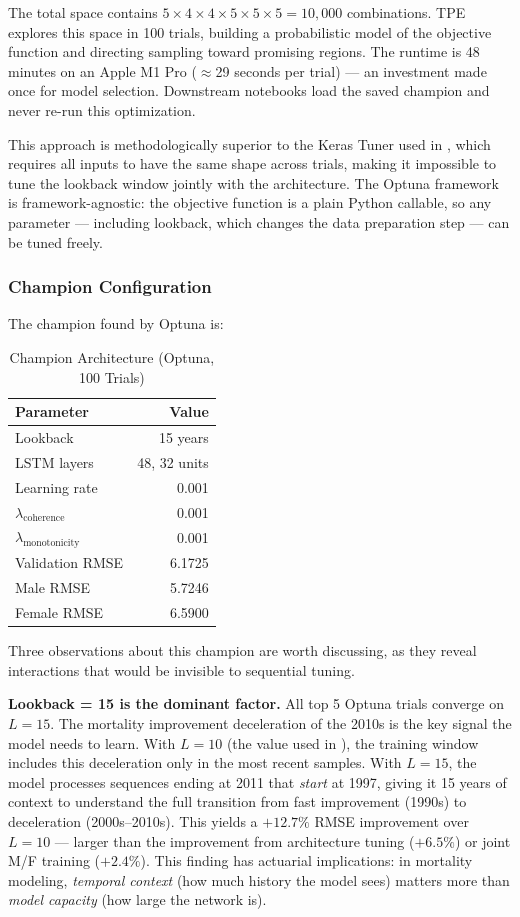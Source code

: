 \documentclass[11pt,a4paper]{article}
\begin{document}
The total space contains $5 \times 4 \times 4 \times 5 \times 5 \times 5 = 10{,}000$ combinations. TPE explores this space in 100 trials, building a probabilistic model of the objective function and directing sampling toward promising regions. The runtime is 48 minutes on an Apple M1 Pro ($\approx$29 seconds per trial) --- an investment made once for model selection. Downstream notebooks load the saved champion and never re-run this optimization.

This approach is methodologically superior to the Keras Tuner used in \cite{rindori2026p04}, which requires all inputs to have the same shape across trials, making it impossible to tune the lookback window jointly with the architecture. The Optuna framework is framework-agnostic: the objective function is a plain Python callable, so any parameter --- including lookback, which changes the data preparation step --- can be tuned freely.

\subsubsection{Champion Configuration}

The champion found by Optuna is:

\begin{table}[H]
\centering
\caption{Champion Architecture (Optuna, 100 Trials)}
\label{tab:champion}
\begin{tabular}{@{}lr@{}}
\toprule
Parameter & Value \\ \midrule
Lookback & 15 years \\
LSTM layers & 48, 32 units \\
Learning rate & 0.001 \\
$\lambda_{\text{coherence}}$ & 0.001 \\
$\lambda_{\text{monotonicity}}$ & 0.001 \\
Validation RMSE & 6.1725 \\
Male RMSE & 5.7246 \\
Female RMSE & 6.5900 \\
\bottomrule
\end{tabular}
\end{table}

Three observations about this champion are worth discussing, as they reveal interactions that would be invisible to sequential tuning.

\textbf{Lookback = 15 is the dominant factor.} All top 5 Optuna trials converge on $L = 15$. The mortality improvement deceleration of the 2010s is the key signal the model needs to learn. With $L = 10$ (the value used in \cite{rindori2026p04}), the training window includes this deceleration only in the most recent samples. With $L = 15$, the model processes sequences ending at 2011 that \textit{start} at 1997, giving it 15 years of context to understand the full transition from fast improvement (1990s) to deceleration (2000s--2010s). This yields a $+12.7\%$ RMSE improvement over $L = 10$ --- larger than the improvement from architecture tuning ($+6.5\%$) or joint M/F training ($+2.4\%$). This finding has actuarial implications: in mortality modeling, \textit{temporal context} (how much history the model sees) matters more than \textit{model capacity} (how large the network is).
\end{document}
